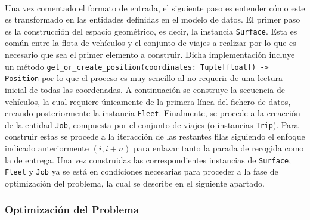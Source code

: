 \documentclass{subfiles}
\begin{document}
          \paragraph{}
          Una vez comentado el formato de entrada, el siguiente paso es entender cómo este es transformado en las entidades definidas en el modelo de datos. El primer paso es la construcción del espacio geométrico, es decir, la instancia \texttt{Surface}. Esta es común entre la flota de vehículos y el conjunto de viajes a realizar por lo que es necesario que sea el primer elemento a construir. Dicha implementación incluye un método \verb|get_or_create_position(coordinates: Tuple[float]) -> Position| por lo que el proceso es muy sencillo al no requerir de una lectura inicial de todas las coordenadas. A continuación se construye la secuencia de vehículos, la cual requiere únicamente de la primera línea del fichero de datos, creando posteriormente la instancia \texttt{Fleet}. Finalmente, se procede a la creacción de la entidad \texttt{Job}, compuesta por el conjunto de viajes (o instancias \texttt{Trip}). Para construir estas se procede a la iteracción de las restantes filas siguiendo el enfoque indicado anteriormente $(i, i+n)$ para enlazar tanto la parada de recogida como la de entrega. Una vez construidas las correspondientes instancias de \texttt{Surface}, \texttt{Fleet} y \texttt{Job} ya se está en condiciones necesarias para proceder a la fase de optimización del problema, la cual se describe en el siguiente apartado.

        \subsubsection{Optimización del Problema}
        \label{sec:implementation_components_optimization}
\end{document}

